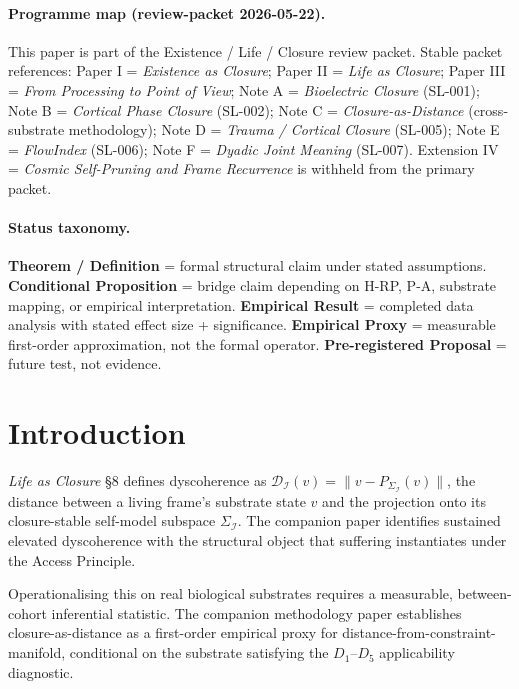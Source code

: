 \documentclass[11pt,a4paper]{article}
\begin{document}
\paragraph{Programme map (review-packet 2026-05-22).}
This paper is part of the Existence / Life / Closure review packet. Stable packet references:
Paper I = \emph{Existence as Closure};
Paper II = \emph{Life as Closure};
Paper III = \emph{From Processing to Point of View};
Note A = \emph{Bioelectric Closure} (SL-001);
Note B = \emph{Cortical Phase Closure} (SL-002);
Note C = \emph{Closure-as-Distance} (cross-substrate methodology);
Note D = \emph{Trauma / Cortical Closure} (SL-005);
Note E = \emph{FlowIndex} (SL-006);
Note F = \emph{Dyadic Joint Meaning} (SL-007).
Extension IV = \emph{Cosmic Self-Pruning and Frame Recurrence} is withheld from the primary packet.

\paragraph{Status taxonomy.}
\textbf{Theorem / Definition} = formal structural claim under stated assumptions.
\textbf{Conditional Proposition} = bridge claim depending on H-RP, P-A, substrate mapping, or empirical interpretation.
\textbf{Empirical Result} = completed data analysis with stated effect size + significance.
\textbf{Empirical Proxy} = measurable first-order approximation, not the formal operator.
\textbf{Pre-registered Proposal} = future test, not evidence.



\section{Introduction}\label{sec:intro}

\emph{Life as Closure} \citep{SmartLifeAsClosure} \S 8 defines dyscoherence as $\mathcal{D}_\mathcal{I}(v) = \|v - P_{\Sigma_\mathcal{I}}(v)\|$, the distance between a living frame's substrate state $v$ and the projection onto its closure-stable self-model subspace $\Sigma_\mathcal{I}$. The companion paper identifies sustained elevated dyscoherence with the structural object that suffering instantiates under the Access Principle.

Operationalising this on real biological substrates requires a measurable, between-cohort inferential statistic. The companion methodology paper \citep{SmartClosureDistance} establishes closure-as-distance as a first-order empirical proxy for distance-from-constraint-manifold, conditional on the substrate satisfying the $D_1$--$D_5$ applicability diagnostic.
\end{document}
